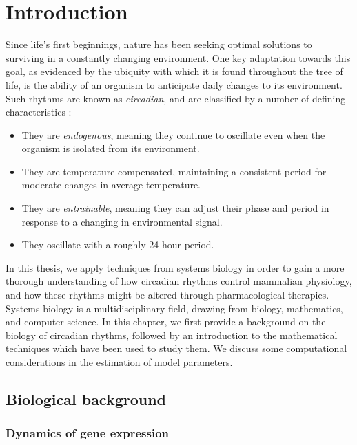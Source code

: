 \chapter{Introduction}
Since life's first beginnings, nature has been seeking optimal solutions to surviving in a constantly changing environment.
One key adaptation towards this goal, as evidenced by the ubiquity with which it is found throughout the tree of life, is the ability of an organism to anticipate daily changes to its environment.
Such rhythms are known as {\itshape circadian}, and are classified by a number of defining characteristics \cite{Dunlap2009}:

\begin{itemize}
  \item They are {\em endogenous}, meaning they continue to oscillate even when the organism is isolated from its environment.

  \item They are temperature compensated, maintaining a consistent period for moderate changes in average temperature.

  \item They are {\em entrainable}, meaning they can adjust their phase and period in response to a changing in environmental signal.

  \item They oscillate with a roughly 24 hour period.
\end{itemize}

In this thesis, we apply techniques from systems biology in order to gain a more thorough understanding of how circadian rhythms control mammalian physiology, and how these rhythms might be altered through pharmacological therapies. %
Systems biology is a multidisciplinary field, drawing from biology, mathematics, and computer science. 
In this chapter, we first provide a background on the biology of circadian rhythms, followed by an introduction to the mathematical techniques which have been used to study them. 
We discuss some computational considerations in the estimation of model parameters.

\section{Biological background}

\subsection{Dynamics of gene expression}

